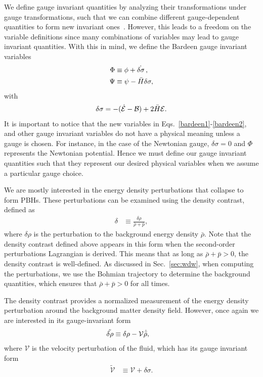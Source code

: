 \documentclass[a4paper,11pt]{article}
\begin{document}
We define gauge invariant quantities by analyzing their transformations under gauge
transformations, such that we can combine different gauge-dependent quantities to form
new invariant ones~\cite{covariant_bardeen}. However, this leads to a freedom on the
variable definitions since many combinations of variables may lead to gauge invariant
quantities. With this in mind, we define the Bardeen gauge invariant
variables~\cite{Bardeen1980}
\begin{align}
	\label{bardeen1}
	\Phi & \equiv \phi + \dot{\delta \sigma}\, , \\
	\label{bardeen2}
	\Psi & \equiv \psi - \Bar{H}\delta \sigma
	,\end{align}
with
\begin{align}
	\delta\sigma = -(\dot{\mathcal{E}} - \mathcal{B}) + {2 \Bar{H}\mathcal{E}}
	.\end{align}
It is important to notice that the new variables in
Eqs.~\eqref{bardeen1}-\eqref{bardeen2}, and other gauge invariant variables do not have
a physical meaning unless a gauge is chosen. For instance, in the case of the Newtonian
gauge, $\delta\sigma = 0$ and $\Phi$ represents the Newtonian potential. Hence we must
define our gauge invariant quantities such that they represent our desired physical
variables when we assume a particular gauge choice.

We are mostly interested in the energy density perturbations that collapse to form PBHs.
These perturbations can be examined using the density contrast, defined as
\begin{align}
	\label{densitycon}
	\delta & \equiv \frac{\delta \rho}{\bar{\rho} + \bar{p}},
\end{align}
where $\delta\rho$ is the perturbation to the background energy density $\bar\rho$.
	{\color{red} Note that the density contrast defined above appears in this form
		when the second-order perturbations Lagrangian is derived. This means
		that as long as $\bar{\rho} + \bar{p} > 0$, the density contrast is well-defined.
		As discussed in Sec.~\ref{sec:wdw}, when computing the perturbations,
		we use the Bohmian trajectory to determine the background quantities,
		which ensures that $\bar{\rho} + \bar{p} > 0$ for all times. }

The density contrast provides a normalized measurement of the energy density
perturbation around the background matter density field. However, once again we are
interested in its gauge-invariant form
\begin{align}
	\label{deltarhoinvariant}
	\tilde{\delta\rho} & \equiv \delta\rho - \mathcal{V} \dot{\Bar{\rho}}
	,\end{align}
where $\mathcal{V}$ is the velocity perturbation of the fluid, which has its gauge
invariant form
\begin{align}
	\tilde{\mathcal{V}} & \equiv \mathcal{V} + \delta\sigma
	.\end{align}
\end{document}
